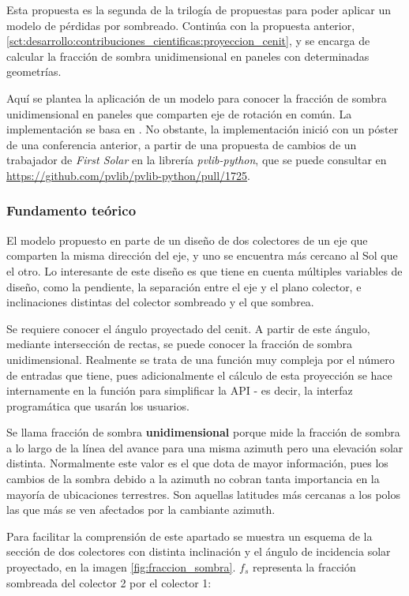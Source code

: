Esta propuesta es la segunda de la trilogía de propuestas para poder aplicar un modelo de pérdidas por sombreado. Continúa con la propuesta anterior, \ref{sct:desarrollo:contribuciones_cientificas:proyeccion_cenit}, y se encarga de calcular la fracción de sombra unidimensional en paneles con determinadas geometrías.

Aquí se plantea la aplicación de un modelo para conocer la fracción de sombra unidimensional en paneles que comparten eje de rotación en común. La implementación se basa en \cite{Anderson_Jensen_2024}. No obstante, la implementación inició con un póster de una conferencia anterior, a partir de una propuesta de cambios de un trabajador de \textit{First Solar} en la librería \textit{pvlib-python}, que se puede consultar en \url{https://github.com/pvlib/pvlib-python/pull/1725}.

\subsubsection{Fundamento teórico}

El modelo propuesto en \cite{Anderson_Jensen_2024} parte de un diseño de dos colectores de un eje que comparten la misma dirección del eje, y uno se encuentra más cercano al Sol que el otro. Lo interesante de este diseño es que tiene en cuenta múltiples variables de diseño, como la pendiente, la separación entre el eje y el plano colector, e inclinaciones distintas del colector sombreado y el que sombrea.

Se requiere conocer el ángulo proyectado del cenit. A partir de este ángulo, mediante intersección de rectas, se puede conocer la fracción de sombra unidimensional. Realmente se trata de una función muy compleja por el número de entradas que tiene, pues adicionalmente el cálculo de esta proyección se hace internamente en la función para simplificar la API - es decir, la interfaz programática que usarán los usuarios.

Se llama fracción de sombra \textbf{unidimensional} porque mide la fracción de sombra a lo largo de la línea del avance para una misma azimuth pero una elevación solar distinta. Normalmente este valor es el que dota de mayor información, pues los cambios de la sombra debido a la azimuth no cobran tanta importancia en la mayoría de ubicaciones terrestres. Son aquellas latitudes más cercanas a los polos las que más se ven afectados por la cambiante azimuth.

Para facilitar la comprensión de este apartado se muestra un esquema de la sección de dos colectores con distinta inclinación y el ángulo de incidencia solar proyectado, en la imagen \ref{fig:fraccion_sombra}. $f_s$ representa la fracción sombreada del colector 2 por el colector 1:

